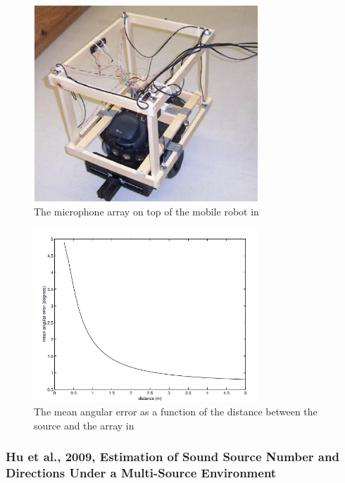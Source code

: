 \documentclass[notitlepage]{report}
\begin{document}
\begin{figure}[H]
\includegraphics[width=0.75\textwidth]{./valin_2003/robot.png}
\centering
\caption{The microphone array on top of the mobile robot in \cite{valin_robust_2003}}
\label{fig:valin_2003_robot}
\centering
\end{figure}

\begin{figure}[H]
\includegraphics[width=0.75\textwidth]{./valin_2003/plot.png}
\centering
\caption{The mean angular error as a function of the distance between the source and the array in \cite{valin_robust_2003}}
\label{fig:valin_2003_plot}
\centering
\end{figure}

\subsubsection{Hu et al., 2009, Estimation of Sound Source Number and Directions Under a Multi-Source Environment}
\end{document}
